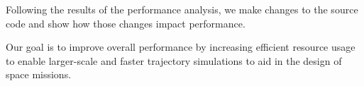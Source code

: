 Following the results of the performance analysis, we make changes to the source code and show how those changes impact performance.

Our goal is to improve overall performance by increasing efficient resource usage to enable larger-scale and faster trajectory simulations to aid in the design of space missions.






